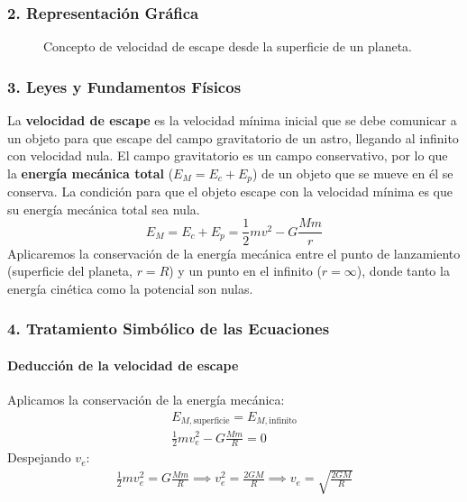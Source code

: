 \subsubsection*{2. Representación Gráfica}
\begin{figure}[H]
    \centering
    \caption{Concepto de velocidad de escape desde la superficie de un planeta.}
\end{figure}

\subsubsection*{3. Leyes y Fundamentos Físicos}
La \textbf{velocidad de escape} es la velocidad mínima inicial que se debe comunicar a un objeto para que escape del campo gravitatorio de un astro, llegando al infinito con velocidad nula.
El campo gravitatorio es un campo conservativo, por lo que la \textbf{energía mecánica total} ($E_M = E_c + E_p$) de un objeto que se mueve en él se conserva.
La condición para que el objeto escape con la velocidad mínima es que su energía mecánica total sea nula.
$$ E_M = E_c + E_p = \frac{1}{2}mv^2 - G\frac{Mm}{r} $$
Aplicaremos la conservación de la energía mecánica entre el punto de lanzamiento (superficie del planeta, $r=R$) y un punto en el infinito ($r=\infty$), donde tanto la energía cinética como la potencial son nulas.

\subsubsection*{4. Tratamiento Simbólico de las Ecuaciones}
\paragraph*{Deducción de la velocidad de escape}
Aplicamos la conservación de la energía mecánica:
\begin{gather}
    E_{M, \text{superficie}} = E_{M, \text{infinito}} \nonumber \\
    \frac{1}{2}mv_e^2 - G\frac{Mm}{R} = 0
\end{gather}
Despejando $v_e$:
\begin{gather}
    \frac{1}{2}mv_e^2 = G\frac{Mm}{R} \implies v_e^2 = \frac{2GM}{R} \implies v_e = \sqrt{\frac{2GM}{R}}
\end{gather}
